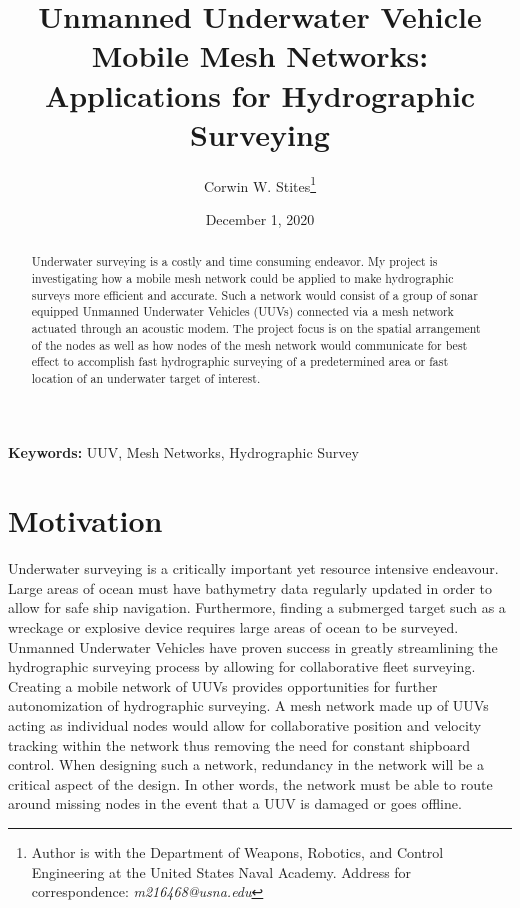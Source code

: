 \documentclass[10pt]{article}
\title{Unmanned Underwater Vehicle Mobile Mesh Networks: Applications for Hydrographic Surveying}
\author{Corwin W. Stites\thanks{Author is with the Department of Weapons, Robotics, and Control Engineering at the United States Naval Academy. Address for correspondence: \emph{m216468@usna.edu}}}
\date{December 1, 2020}
\begin{document}
\maketitle

\begin{abstract}
	Underwater surveying is a costly and time consuming endeavor. My project is investigating how a mobile mesh network could be applied to make hydrographic surveys more efficient and accurate. Such a network would consist of a group of sonar equipped Unmanned Underwater Vehicles (UUVs) connected via a mesh network actuated through an acoustic modem. The project focus is on the spatial arrangement of the nodes as well as how nodes of the mesh network would communicate for best effect to accomplish fast hydrographic surveying of a predetermined area or fast location of an underwater target of interest.  
\end{abstract}

{\scriptsize\textbf{Keywords: } UUV, Mesh Networks, Hydrographic Survey}

\section{Motivation}
Underwater surveying is a critically important yet resource intensive endeavour. Large areas of ocean must have bathymetry data regularly updated in order to allow for safe ship navigation. Furthermore, finding a submerged target such as a wreckage or explosive device  requires large areas of ocean to be surveyed. Unmanned Underwater Vehicles have proven success in greatly streamlining the hydrographic surveying process by allowing for collaborative fleet surveying. Creating a mobile network of UUVs provides opportunities for further autonomization of hydrographic surveying.  A mesh network made up of UUVs acting as individual nodes would allow for collaborative position and velocity tracking within the network thus removing the need for constant shipboard control. When designing such a network, redundancy in the network will be a critical aspect of the design. In other words, the network must be able to route around missing nodes in the event that a UUV is damaged or goes offline.
\end{document}
